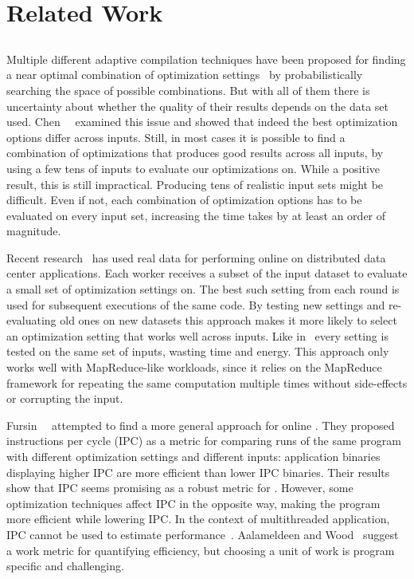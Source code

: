 \section{Related Work}\label{sec:relatedwork}

\subsection{{\IterComp}}
Multiple different adaptive compilation techniques have been proposed for finding a near optimal combination of optimization
settings~\cite{agakov06,hoste2008cole,kulkarni04,stephenson03} by probabilistically searching the space of possible combinations. But with
all of them there is uncertainty about whether the quality of their results depends on the data set used. Chen~\etal~\cite{chen10,chen12a}
examined this issue and showed that indeed the best optimization options differ across inputs. Still, in most cases it is possible to find
a combination of optimizations that produces good results across all inputs, by using a few tens of inputs to evaluate our optimizations
on. While a positive result, this is still impractical. Producing tens of realistic input sets might be difficult. Even if not, each
combination of optimization options has to be evaluated on every input set, increasing the time \itercomp takes by at least an order of
magnitude.

Recent research~\cite{chen12b,fang15} has used real data for performing online {\itercomp} on distributed data center applications. Each
worker receives a subset of the input dataset to evaluate a small set of optimization settings on. The best such setting from each round
is used for subsequent executions of the same code. By testing new settings and re-evaluating old ones on new datasets this approach makes
it more likely to select an optimization setting that works well across inputs. Like in~\cite{chen10} every setting is tested on the same
set of inputs, wasting time and energy. This approach only works well with MapReduce-like workloads, since it relies on the MapReduce
framework for repeating the same computation multiple times without side-effects or corrupting the input.

Fursin~\etal~\cite{fursin07} attempted to find a more general approach for online \itercomp. They proposed instructions per cycle (IPC) as
a metric for comparing runs of the same program with different optimization settings and different inputs: application binaries displaying
higher IPC are more efficient than lower IPC binaries. Their results show that IPC seems promising as a robust metric for {\itercomp}.
However, some optimization techniques affect IPC in the opposite way, making the program more efficient while lowering IPC. In the context
of multithreaded application, IPC cannot be used to estimate performance~\cite{alameldeen06,eyerman08}. Aalameldeen and
Wood~\cite{alameldeen06} suggest a work metric for quantifying efficiency, but choosing a unit of work is program specific and challenging.


